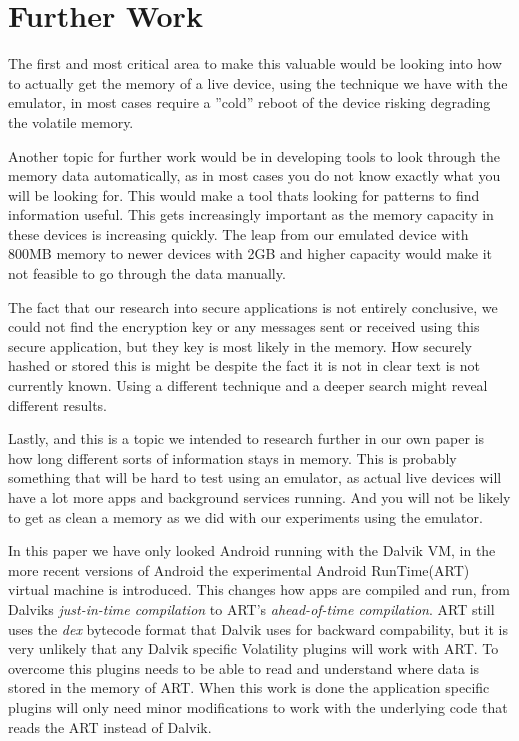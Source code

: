 \section{Further Work}
The first and most critical area to make this valuable would
be looking into how to actually get the memory of a live
device, using the technique we have with the emulator, in most
cases require a ”cold” reboot of the device risking degrading
the volatile memory.

Another topic for further work would be in developing tools
to look through the memory data automatically, as in most
cases you do not know exactly what you will be looking for.
This would make a tool thats looking for patterns to find information useful.
This gets increasingly important as the memory capacity
in these devices is increasing quickly. The leap from our
emulated device with 800MB memory to newer devices with
2GB and higher capacity would make it not feasible to go
through the data manually.

The fact that our research into secure applications is not
entirely conclusive, we could not find the encryption key or any
messages sent or received using this secure application, but
they key is most likely in the memory. How securely hashed
or stored this is might be despite the fact it is not in clear text
is not currently known. Using a different technique and a deeper
search might reveal different results.

Lastly, and this is a topic we intended to research further
in our own paper is how long different sorts of information
stays in memory. This is probably something that will be hard
to test using an emulator, as actual live devices will have a lot
more apps and background services running. And you will not be
likely to get as clean a memory as we did with our experiments
using the emulator.

In this paper we have only looked Android running with
the Dalvik VM, in the more recent versions of
Android the experimental Android RunTime(ART) virtual
machine is introduced. This changes how apps are compiled
and run, from Dalviks \textit{just-in-time compilation} to
ART’s \textit{ahead-of-time compilation}. ART still uses the
\textit{dex} bytecode format that Dalvik uses for backward
compability, but it is very unlikely that any Dalvik specific
Volatility plugins will work with ART. To overcome this plugins
needs to be able to read and understand where data is stored in the memory of
ART. When this work is done the application specific plugins will only need
minor modifications to work with the underlying code that reads the ART instead
of Dalvik.

